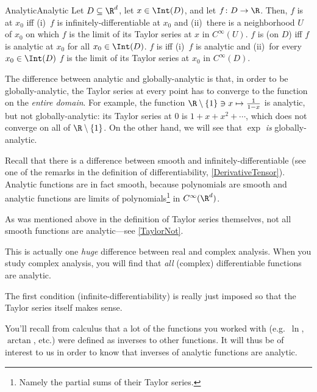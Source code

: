 \begin{dfn}{Analytic}{Analytic}
Let $D\subseteq \R ^d$, let $x\in \Int (D)$, and let $f\colon D\rightarrow \R$.  Then, $f$ is  at $x_0$ iff (i)~$f$ is infinitely-differentiable at $x_0$ and (ii)~there is a neighborhood $U$ of $x_0$ on which $f$ is the limit of its Taylor series at $x$ in $C^\infty (U)$.  $f$ is  (on $D$) iff $f$ is analytic at $x_0$ for all $x_0\in \Int (D)$.  $f$ is  iff (i)~$f$ is analytic and (ii)~for every $x_0\in \Int (D)$ $f$ is the limit of its Taylor series at $x_0$ in $C^\infty (D)$.
\begin{rmk}
The difference between analytic and globally-analytic is that, in order to be globally-analytic, the Taylor series at every point has to converge to the function on the \emph{entire domain}.  For example, the function $\R \setminus \{ 1\} \ni x\mapsto \frac{1}{1-x}$ is analytic, but not globally-analytic:  its Taylor series at $0$ is $1+x+x^2+\cdots$, which does not converge on all of $\R \setminus \{ 1\}$.  On the other hand, we will see that $\exp$ \emph{is} globally-analytic.
\end{rmk}
\begin{rmk}
Recall that there is a difference between smooth and infinitely-differentiable (see one of the remarks in the definition of differentiability, \cref{DerivativeTensor}).  Analytic functions are in fact smooth, because polynomials are smooth and analytic functions are limits of polynomials\footnote{Namely the partial sums of their Taylor series.} in $C^\infty (\R ^d)$.
\end{rmk}
\begin{rmk}
As was mentioned above in the definition of Taylor series themselves, not all smooth functions are analytic---see \cref{TaylorNot}.
\end{rmk}
\begin{rmk}
This is actually one \emph{huge} difference between real and complex analysis.  When you study complex analysis, you will find that \emph{all} (complex) differentiable functions are analytic.  
\end{rmk}
\begin{rmk}
The first condition (infinite-differentiability) is really just imposed so that the Taylor series itself makes sense.
\end{rmk}
\end{dfn}
You'll recall from calculus that a lot of the functions you worked with (e.g.~$\ln$, $\arctan$, etc.) were defined as inverses to other functions.  It will thus be of interest to us in order to know that inverses of analytic functions are analytic.
